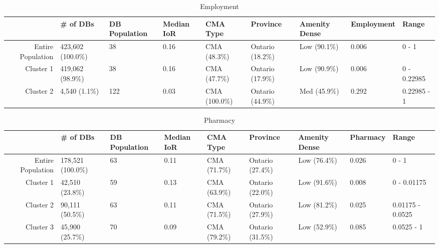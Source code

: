 \documentclass[10pt, a4paper]{article}
\begin{document}
 

\begin{sidewaystable}[ht]
\centering
\begin{tabular}{rllllllll}
  \hline
 & \# of DBs & DB Population & Median IoR & CMA Type & Province & Amenity Dense & Employment & Range \\ 
  \hline
Entire Population & 423,602 (100.0\%) & 38 & 0.16 & CMA (48.3\%) & Ontario (18.2\%) & Low (90.1\%) & 0.006 & 0 - 1 \\ 
  Cluster 1 & 419,062 (98.9\%) & 38 & 0.16 & CMA (47.7\%) & Ontario (17.9\%) & Low (90.9\%) & 0.006 & 0 - 0.22985 \\ 
  Cluster 2 & 4,540 (1.1\%) & 122 & 0.03 & CMA (100.0\%) & Ontario (44.9\%) & Med (45.9\%) & 0.292 & 0.22985 - 1 \\ 
   \hline
\end{tabular}
\caption{Employment} 
\end{sidewaystable}





 \pagebreak 
 
\begin{sidewaystable}[ht]
\centering
\begin{tabular}{rllllllll}
  \hline
 & \# of DBs & DB Population & Median IoR & CMA Type & Province & Amenity Dense & Pharmacy & Range \\ 
  \hline
Entire Population & 178,521 (100.0\%) & 63 & 0.11 & CMA (71.7\%) & Ontario (27.4\%) & Low (76.4\%) & 0.026 & 0 - 1 \\ 
  Cluster 1 & 42,510 (23.8\%) & 59 & 0.13 & CMA (63.9\%) & Ontario (22.0\%) & Low (91.6\%) & 0.008 & 0 - 0.01175 \\ 
  Cluster 2 & 90,111 (50.5\%) & 63 & 0.11 & CMA (71.5\%) & Ontario (27.9\%) & Low (81.2\%) & 0.025 & 0.01175 - 0.0525 \\ 
  Cluster 3 & 45,900 (25.7\%) & 70 & 0.09 & CMA (79.2\%) & Ontario (31.5\%) & Low (52.9\%) & 0.085 & 0.0525 - 1 \\ 
   \hline
\end{tabular}
\caption{Pharmacy} 
\end{sidewaystable}





 \pagebreak 
 
\end{document}
